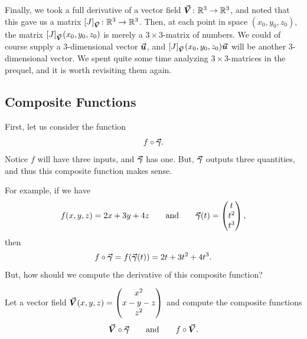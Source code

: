      	Finally, we took a full derivative of a vector field $\boldsymbol{\vec{V}} \colon \mathbb{R}^3 \to \mathbb{R}^3$, and noted that this gave us a matrix $[J]_{\boldsymbol{\vec{V}}} \colon \mathbb{R}^3 \to \mathbb{R}^3$. Then, at each point in space $(x_0,y_0,z_0)$, the matrix $[J]_{\boldsymbol{\vec{V}}}(x_0,y_0,z_0)$ is merely a $3\times 3$-matrix of numbers. We could of course supply a 3-dimensional vector $\boldsymbol{\boldsymbol{\vec{u}}}$, and $[J]_{\boldsymbol{\vec{V}}}(x_0,y_0,z_0)\boldsymbol{\boldsymbol{\vec{u}}}$ will be another 3-dimensional vector.  We spent quite some time analyzing $3\times 3$-matrices in the prequel, and it is worth revisiting them again.

     	\subsection{Composite Functions}

     	First, let us consider the function
     	\[
     	f\circ \boldsymbol{\vec{\gamma}}.
     	\]
     	Notice $f$ will have three inputs, and $\boldsymbol{\vec{\gamma}}$ has one. But, $\boldsymbol{\vec{\gamma}}$ outputs three quantities, and thus this composite function makes sense.

     	For example, if we have
     	\[
     	f(x,y,z) = 2x + 3y + 4z \qquad \textrm{and} \qquad \boldsymbol{\vec{\gamma}}(t) = \begin{pmatrix} t \\ t^2 \\ t^3 \end{pmatrix},
     	\]
     	then
     	\[
     	f\circ \boldsymbol{\vec{\gamma}} = f(\boldsymbol{\vec{\gamma}}(t)) = 2t+3t^2+4t^3.
     	\]
     	But, how should we compute the derivative of this composite function?

     	\begin{exercise}
     		Let a vector field $\boldsymbol{\vec{V}}(x,y,z) = \begin{pmatrix} x^2 \\ x-y-z \\ z^2 \end{pmatrix}$ and compute the composite functions
     		\[
     		\boldsymbol{\vec{V}}\circ \boldsymbol{\vec{\gamma}} \qquad \textrm{and} \qquad f\circ \boldsymbol{\vec{V}}.
     		\]
     	\end{exercise}

